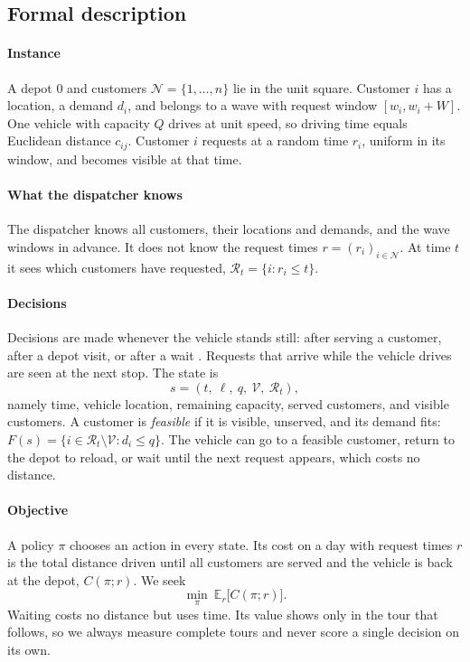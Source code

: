 \documentclass[5p,times,authoryear]{elsarticle}
\begin{document}
\subsection{Formal description}

\paragraph{Instance}
A depot $0$ and customers $\mathcal{N}=\{1,\dots,n\}$ lie in the unit square. Customer $i$ has a location, a demand $d_i$, and belongs to a wave with request window $[w_i,w_i+W]$. One vehicle with capacity $Q$ drives at unit speed, so driving time equals Euclidean distance $c_{ij}$. Customer $i$ requests at a random time $r_i$, uniform in its window, and becomes visible at that time.

\paragraph{What the dispatcher knows}
The dispatcher knows all customers, their locations and demands, and the wave windows in advance. It does not know the request times $r=(r_i)_{i\in\mathcal{N}}$. At time $t$ it sees which customers have requested, $\mathcal{R}_t=\{i:r_i\le t\}$.

\paragraph{Decisions}
Decisions are made whenever the vehicle stands still: after serving a customer, after a depot visit, or after a wait \citep{ulmer2020modeling}. Requests that arrive while the vehicle drives are seen at the next stop. The state is
\begin{equation}
s=(t,\ \ell,\ q,\ \mathcal{V},\ \mathcal{R}_t),
\label{eq:state}
\end{equation}
namely time, vehicle location, remaining capacity, served customers, and visible customers. A customer is \emph{feasible} if it is visible, unserved, and its demand fits: $F(s)=\{i\in\mathcal{R}_t\setminus\mathcal{V}: d_i\le q\}$. The vehicle can go to a feasible customer, return to the depot to reload, or wait until the next request appears, which costs no distance.

\paragraph{Objective}
A policy $\pi$ chooses an action in every state. Its cost on a day with request times $r$ is the total distance driven until all customers are served and the vehicle is back at the depot, $C(\pi;r)$. We seek
\begin{equation}
\min_{\pi}\ \mathbb{E}_{r}\bigl[C(\pi;r)\bigr].
\label{eq:objective}
\end{equation}
Waiting costs no distance but uses time. Its value shows only in the tour that follows, so we always measure complete tours and never score a single decision on its own.
\end{document}
